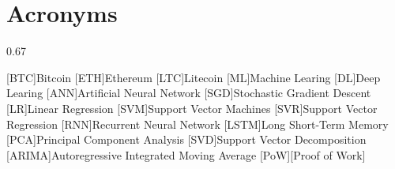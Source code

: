 \chapter*{Acronyms}

\begin{acronym}[ARIMA]
{\setlength{\baselineskip}%
{0.67\baselineskip}

[BTC]{Bitcoin}
[ETH]{Ethereum}
[LTC]{Litecoin}
[ML]{Machine Learing}
[DL]{Deep Learing}
[ANN]{Artificial Neural Network}
[SGD]{Stochastic Gradient Descent}
[LR]{Linear Regression}
[SVM]{Support Vector Machines}
[SVR]{Support Vector Regression}
[RNN]{Recurrent Neural Network}
[LSTM]{Long Short-Term Memory}
[PCA]{Principal Component Analysis}
[SVD]{Support Vector Decomposition}
[ARIMA]{Autoregressive Integrated Moving Average}
[PoW][Proof of Work]


\par}
\end{acronym}